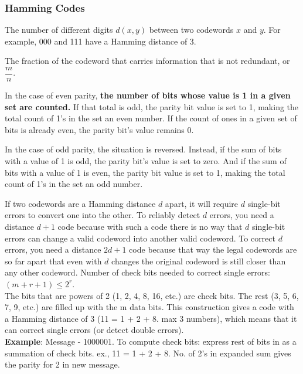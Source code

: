 \documentclass[a4paper,oneside]{book}
\begin{document}
\subsubsection{Hamming Codes}
\begin{definition}
 The number of different digits $d(x, y)$ between two codewords $x$ and $y$. For example, 000 and 111 have a Hamming distance of 3.
\end{definition}
\begin{definition}[Coderate]
The fraction of the codeword that carries information that is not redundant, or $\dfrac{m}{n}$.
\end{definition}
\begin{definition}
In the case of even parity, \textbf{the number of bits whose value is 1 in a given set are counted.} If that total is odd, the parity bit value is set to 1, making the total count of 1's in the set an even number. If the count of ones in a given set of bits is already even, the parity bit's value remains 0.
\end{definition}
\begin{definition}
In the case of odd parity, the situation is reversed. Instead, if the sum of bits with a value of 1 is odd, the parity bit's value is set to zero. And if the sum of bits with a value of 1 is even, the parity bit value is set to 1, making the total count of 1's in the set an odd number.
\end{definition}
If two codewords are a Hamming distance $d$ apart, it will require $d$ single-bit errors to convert one into the other.
To reliably detect $d$ errors, you need a distance $d + 1$ code because with such a code there is no way that $d$ single-bit errors can change a valid codeword into another valid codeword. To correct $d$ errors, you need a distance $2d + 1$ code because that way the legal codewords are so far apart that even with $d$ changes the original codeword is still closer than any other codeword. 
Number of check bits needed to correct single errors: $(m + r + 1) \le 2^r$.\\
The bits that are powers of 2 (1, 2, 4, 8, 16, etc.) are check bits. The rest (3, 5, 6, 7, 9, etc.) are filled up with the m data bits. This construction gives a code with a Hamming distance of 3 (11 = 1 + 2 + 8. max 3 numbers), which means that it can correct single errors (or detect double errors). \\
\textbf{Example}: Message - 1000001. To compute  check bits: express rest of bits in as a summation of check bits. ex., 11 = 1 + 2 + 8. No. of 2's in expanded sum gives the parity for 2 in new message.
\end{document}
